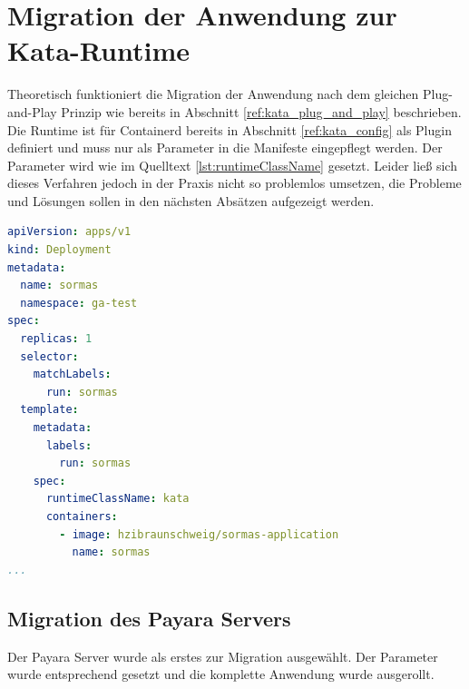 \section{Migration der Anwendung zur Kata-Runtime}
Theoretisch funktioniert die Migration der Anwendung nach dem gleichen Plug-and-Play Prinzip wie bereits in Abschnitt \ref{ref:kata_plug_and_play} beschrieben.
Die Runtime ist für Containerd bereits in Abschnitt \ref{ref:kata_config} als Plugin definiert und muss nur als Parameter in die Manifeste eingepflegt werden.
Der Parameter wird wie im Quelltext \ref{lst:runtimeClassName} gesetzt.
Leider ließ sich dieses Verfahren jedoch in der Praxis nicht so problemlos umsetzen, die Probleme und Lösungen sollen in den nächsten Absätzen aufgezeigt werden. 

\begin{lstlisting}[language=yaml, caption=runtimeClassName, label=lst:runtimeClassName]
apiVersion: apps/v1
kind: Deployment
metadata:
  name: sormas
  namespace: ga-test
spec: 
  replicas: 1
  selector: 
    matchLabels:
      run: sormas
  template:
    metadata:
      labels:
        run: sormas
    spec:
      runtimeClassName: kata
      containers:
        - image: hzibraunschweig/sormas-application
          name: sormas
...
\end{lstlisting}


\subsection{Migration des Payara Servers}
\label{ref:payara_kata}
Der Payara Server wurde als erstes zur Migration ausgewählt. 
Der Parameter wurde entsprechend gesetzt und die komplette Anwendung wurde ausgerollt. 

